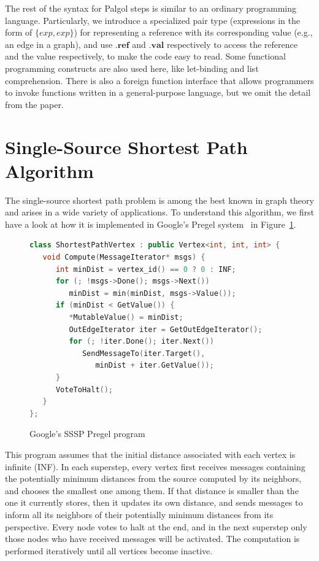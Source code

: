 \documentclass{sokendai_thesis} %
\begin{document}
The rest of the syntax for Palgol steps is similar to an ordinary programming language.
Particularly, we introduce a specialized pair type (expressions in the form of $\{\mathit{exp},\mathit{exp}\}$) for representing a reference with its corresponding value (e.g., an edge in a graph), and use $.\mathbf{ref}$ and $.\mathbf{val}$ respectively to access the reference and the value respectively, to make the code easy to read.
Some functional programming constructs are also used here, like let-binding and list comprehension.
There is also a foreign function interface that allows programmers to invoke functions written in a general-purpose language, but we omit the detail from the paper.

\section{Single-Source Shortest Path Algorithm}
\label{sec:sssp}

The single-source shortest path problem is among the best known in graph theory and arises in a wide variety of applications.
To understand this algorithm, we first have a look at how it is implemented in Google's Pregel system~\cite{pregel} in Figure~\ref{fig:sssp-pregel}.
\begin{figure}[thp]
\vspace{-2ex}
\begin{lstlisting}[basicstyle=\small\ttfamily,numbers=none,language=c++]
class ShortestPathVertex : public Vertex<int, int, int> {
   void Compute(MessageIterator* msgs) {
      int minDist = vertex_id() == 0 ? 0 : INF;
      for (; !msgs->Done(); msgs->Next())
         minDist = min(minDist, msgs->Value());
      if (minDist < GetValue()) {
         *MutableValue() = minDist;
         OutEdgeIterator iter = GetOutEdgeIterator();
         for (; !iter.Done(); iter.Next())
            SendMessageTo(iter.Target(),
               minDist + iter.GetValue());
      }
      VoteToHalt();
   }
};
\end{lstlisting}
\vspace{-2ex}
\caption{Google's SSSP Pregel program~\protect\cite{pregel}}
\label{fig:sssp-pregel}
\end{figure}

This program assumes that the initial distance associated with each vertex is infinite (INF).
In each superstep, every vertex first receives messages containing the potentially minimum distances from the source computed by its neighbors, and chooses the smallest one among them.
If that distance is smaller than the one it currently stores, then it updates its own distance, and sends messages to inform all its neighbors of their potentially minimum distances from its perspective.
Every node votes to halt at the end, and in the next superstep only those nodes who have received messages will be activated.
The computation is performed iteratively until all vertices become inactive.
\end{document}
